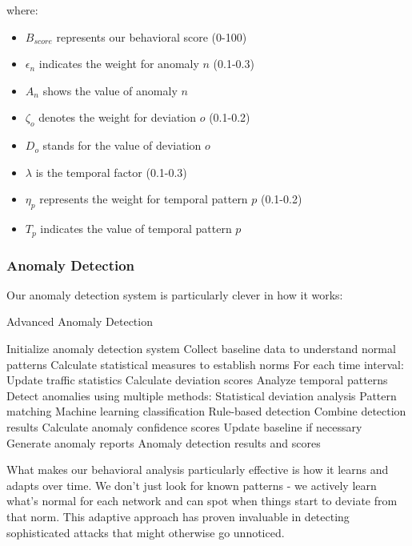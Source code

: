 \documentclass[conference]{IEEEtran}
\begin{document}
where:
\begin{itemize}[leftmargin=*]
    \item $B_{score}$ represents our behavioral score (0-100)
    \item $\epsilon_n$ indicates the weight for anomaly $n$ (0.1-0.3)
    \item $A_n$ shows the value of anomaly $n$
    \item $\zeta_o$ denotes the weight for deviation $o$ (0.1-0.2)
    \item $D_o$ stands for the value of deviation $o$
    \item $\lambda$ is the temporal factor (0.1-0.3)
    \item $\eta_p$ represents the weight for temporal pattern $p$ (0.1-0.2)
    \item $T_p$ indicates the value of temporal pattern $p$
\end{itemize}

\subsubsection{Anomaly Detection}
Our anomaly detection system is particularly clever in how it works:

\begin{algorithm}[H]
\caption{Advanced Anomaly Detection}
\begin{algorithmic}[1]
\STATE Initialize anomaly detection system
\STATE Collect baseline data to understand normal patterns
\STATE Calculate statistical measures to establish norms
\STATE For each time interval:
\STATE \quad Update traffic statistics
\STATE \quad Calculate deviation scores
\STATE \quad Analyze temporal patterns
\STATE \quad Detect anomalies using multiple methods:
\STATE \quad \quad Statistical deviation analysis
\STATE \quad \quad Pattern matching
\STATE \quad \quad Machine learning classification
\STATE \quad \quad Rule-based detection
\STATE \quad Combine detection results
\STATE \quad Calculate anomaly confidence scores
\STATE \quad Update baseline if necessary
\STATE \quad Generate anomaly reports
\RETURN Anomaly detection results and scores
\end{algorithmic}
\end{algorithm}

What makes our behavioral analysis particularly effective is how it learns and adapts over time. We don't just look for known patterns - we actively learn what's normal for each network and can spot when things start to deviate from that norm. This adaptive approach has proven invaluable in detecting sophisticated attacks that might otherwise go unnoticed.
\end{document}

